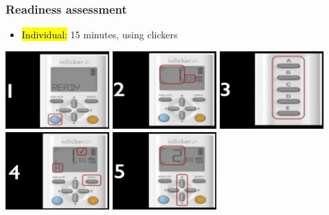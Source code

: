\documentclass[11pt,containsverbatim,handout,xcolor=xelatex,dvipsnames,table]{beamer}
\begin{document}
\begin{frame}
\frametitle{Readiness assessment}

\begin{itemize}

\item \hl{Individual:} 15 minutes, using clickers

\end{itemize}

\begin{center}
\includegraphics[width=0.3\textwidth]{figures/clicker_self_paced/self_paced_1}
\hspace{1mm}
\includegraphics[width=0.3\textwidth]{figures/clicker_self_paced/self_paced_2}
\hspace{1mm}
\includegraphics[width=0.3\textwidth]{figures/clicker_self_paced/self_paced_3} \\
\includegraphics[width=0.3\textwidth]{figures/clicker_self_paced/self_paced_4}
\hspace{1mm}
\includegraphics[width=0.3\textwidth]{figures/clicker_self_paced/self_paced_5}
\end{center}


\end{frame}
\end{document}
